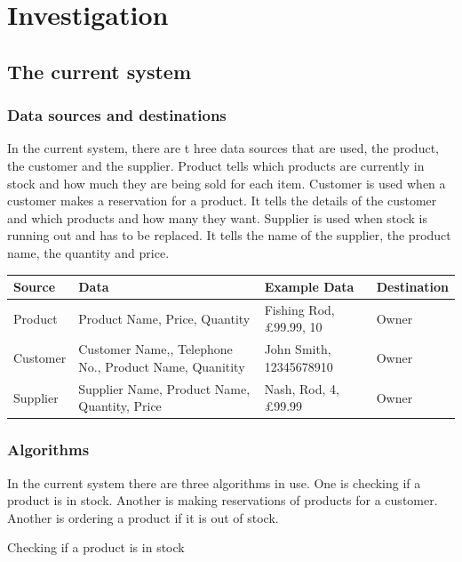 \section{Investigation}

\subsection{The current system}

\subsubsection{Data sources and destinations}
In the current system, there are t hree data sources that are used, the product, the customer and the supplier. Product tells which products are currently in stock and how much they are being sold for each item. Customer is used when a customer makes a reservation for a product. It tells the details of the customer and which products and how many they want. Supplier is used when stock is running out and has to be replaced. It tells the name of the supplier, the product name, the quantity and price.

\begin{center}
\begin{tabular}{| l | p{5cm} | l | l |}
    \hline
    \textbf{Source} & \textbf{Data} & \textbf{Example Data} & \textbf{Destination} \\ \hline
    Product & Product Name, Price, Quantity & Fishing Rod, £99.99, 10 & Owner \\ \hline
    Customer & Customer Name,, Telephone No., Product Name, Quanitity & John Smith, 12345678910 & Owner \\ \hline
    Supplier & Supplier Name, Product Name, Quantity, Price & Nash, Rod, 4, £99.99 & Owner \\ \hline
  
\end{tabular}
\label{tab:range_examples}
\end{center}

\subsubsection{Algorithms}
In the current system there are three algorithms in use. One is checking if a product is in stock. Another is making reservations of products for a customer. Another is ordering a product if it is out of stock.


\begin{algorithm}[H]
    \caption{Checking if a product is in stock}
\begin{algorithmic}[1]
\State
{}
    \EndIf
\EndWhile
\end{algorithmic}
\end{algorithm}


